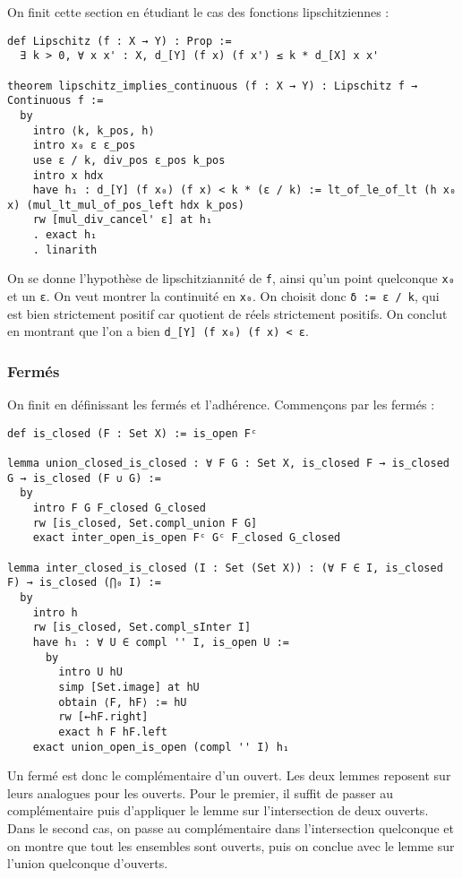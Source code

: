 \documentclass[a4paper, 12pt]{article}
\newcommand{\lean}[1]{\texttt{#1}}
\begin{document}
On finit cette section en étudiant le cas des fonctions lipschitziennes :

\begin{verbatim}
def Lipschitz (f : X → Y) : Prop :=
  ∃ k > 0, ∀ x x' : X, d_[Y] (f x) (f x') ≤ k * d_[X] x x'

theorem lipschitz_implies_continuous (f : X → Y) : Lipschitz f → Continuous f :=
  by
    intro ⟨k, k_pos, h⟩
    intro x₀ ε ε_pos
    use ε / k, div_pos ε_pos k_pos
    intro x hdx
    have h₁ : d_[Y] (f x₀) (f x) < k * (ε / k) := lt_of_le_of_lt (h x₀ x) (mul_lt_mul_of_pos_left hdx k_pos)
    rw [mul_div_cancel' ε] at h₁
    . exact h₁
    . linarith
\end{verbatim}

On se donne l'hypothèse de lipschitziannité de \lean{f}, ainsi qu'un point quelconque \lean{x₀} et un \lean{ε}. On veut montrer la continuité en \lean{x₀}. On choisit donc \lean{δ := ε / k}, qui est bien strictement positif car quotient de réels strictement positifs. On conclut en montrant que l'on a bien \lean{d_[Y] (f x₀) (f x) < ε}.

\subsubsection{Fermés}

On finit en définissant les fermés et l'adhérence. Commençons par les fermés :

\begin{verbatim}
def is_closed (F : Set X) := is_open Fᶜ

lemma union_closed_is_closed : ∀ F G : Set X, is_closed F → is_closed G → is_closed (F ∪ G) :=
  by
    intro F G F_closed G_closed
    rw [is_closed, Set.compl_union F G]
    exact inter_open_is_open Fᶜ Gᶜ F_closed G_closed

lemma inter_closed_is_closed (I : Set (Set X)) : (∀ F ∈ I, is_closed F) → is_closed (⋂₀ I) :=
  by
    intro h
    rw [is_closed, Set.compl_sInter I]
    have h₁ : ∀ U ∈ compl '' I, is_open U :=
      by
        intro U hU
        simp [Set.image] at hU
        obtain ⟨F, hF⟩ := hU
        rw [←hF.right]
        exact h F hF.left
    exact union_open_is_open (compl '' I) h₁
\end{verbatim}

Un fermé est donc le complémentaire d'un ouvert. Les deux lemmes reposent sur leurs analogues pour les ouverts. Pour le premier, il suffit de passer au complémentaire puis d'appliquer le lemme sur l'intersection de deux ouverts. Dans le second cas, on passe au complémentaire dans l'intersection quelconque et on montre que tout les ensembles sont ouverts, puis on conclue avec le lemme sur l'union quelconque d'ouverts.
\end{document}
